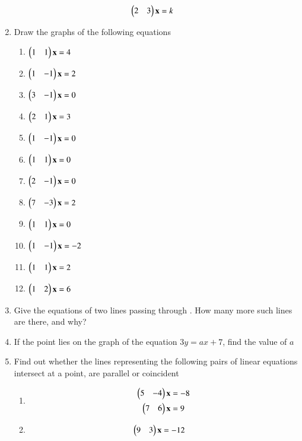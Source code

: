 \begin{enumerate}[label=\arabic*.,ref=\thesubsection.\theenumi]
%
%
\begin{align}
\begin{pmatrix}2 & 3\end{pmatrix}\mathbf{x} &= k
\end{align}
%
%
\item Draw the graphs of the following equations
\begin{enumerate}[itemsep=2pt]
\item $\begin{pmatrix}1 & 1\end{pmatrix}\mathbf{x} = 4$
\item $\begin{pmatrix} 1 & -1\end{pmatrix}\mathbf{x}  = 2 $
\item $\begin{pmatrix} 3 & -1\end{pmatrix}\mathbf{x}  = 0$
\item $\begin{pmatrix} 2 & 1\end{pmatrix}\mathbf{x}  = 3$
\item $\begin{pmatrix} 1 & -1\end{pmatrix}\mathbf{x}  = 0$
\item $\begin{pmatrix} 1& 1\end{pmatrix}\mathbf{x}  = 0$
\item $\begin{pmatrix} 2& -1\end{pmatrix}\mathbf{x}  = 0$
\item $\begin{pmatrix} 7& -3\end{pmatrix}\mathbf{x}  = 2$
\item $\begin{pmatrix} 1& 1\end{pmatrix}\mathbf{x}  = 0$
\item $\begin{pmatrix} 1& -1\end{pmatrix}\mathbf{x}  = -2$
\item $\begin{pmatrix} 1& 1\end{pmatrix}\mathbf{x}  = 2$
\item $\begin{pmatrix} 1& 2\end{pmatrix}\mathbf{x}  = 6$
\end{enumerate}
%
\item Give the equations of two lines passing through . How many more such lines are there, and why?
\item If the point  lies on the graph of the equation $3y = ax + 7$, find the value of $a$
\item Find out whether the lines representing the
following pairs of linear equations intersect at a point, are parallel or coincident
%
\begin{enumerate}[itemsep=2pt]
\item
\begin{align}
\begin{split}
\begin{pmatrix}5 & -4 \end{pmatrix}\mathbf{x}&=-8
\\
\begin{pmatrix}7 & 6 \end{pmatrix}\mathbf{x}&=9
\end{split}
\end{align}
\item
\begin{align}
\begin{split}
\myvec{9 & 3 }\vec{x}&=-12

\end{split}
\end{align}
\end{enumerate}
\end{enumerate}
